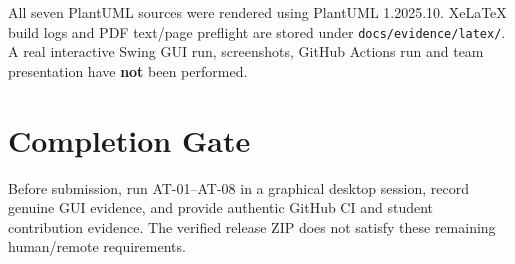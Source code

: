 \documentclass[11pt,a4paper]{article}
\begin{document}
All seven PlantUML sources were rendered using PlantUML 1.2025.10. XeLaTeX build logs and PDF text/page preflight are stored under \texttt{docs/evidence/latex/}. A real interactive Swing GUI run, screenshots, GitHub Actions run and team presentation have \textbf{not} been performed.

\section{Completion Gate}
Before submission, run AT-01--AT-08 in a graphical desktop session, record genuine GUI evidence, and provide authentic GitHub CI and student contribution evidence. The verified release ZIP does not satisfy these remaining human/remote requirements.
\end{document}
